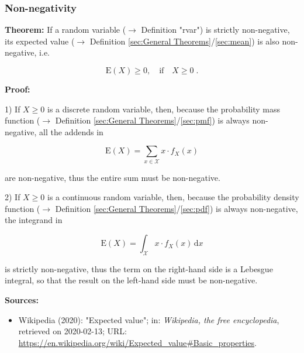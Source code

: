 \documentclass[a4paper,12pt]{book}
\begin{document}
\subsubsection[\textbf{Non-negativity}]{Non-negativity} \label{sec:mean-nonneg}

\vspace{1em}
\textbf{Theorem:} If a random variable ($\rightarrow$ Definition "rvar") is strictly non-negative, its expected value ($\rightarrow$ Definition \ref{sec:General Theorems}/\ref{sec:mean}) is also non-negative, i.e.

\begin{equation} \label{eq:mean-nonneg-mean-nonneg}
\mathrm{E}(X) \geq 0, \quad \text{if} \quad X \geq 0 \; .
\end{equation}


\vspace{1em}
\textbf{Proof:}

1) If $X \geq 0$ is a discrete random variable, then, because the probability mass function ($\rightarrow$ Definition \ref{sec:General Theorems}/\ref{sec:pmf}) is always non-negative, all the addends in

\begin{equation} \label{eq:mean-nonneg-mean-disc}
\mathrm{E}(X) = \sum_{x \in \mathcal{X}} x \cdot f_X(x)
\end{equation}

are non-negative, thus the entire sum must be non-negative.

\vspace{1em}
2) If $X \geq 0$ is a continuous random variable, then, because the probability density function ($\rightarrow$ Definition \ref{sec:General Theorems}/\ref{sec:pdf}) is always non-negative, the integrand in

\begin{equation} \label{eq:mean-nonneg-mean-cont}
\mathrm{E}(X) = \int_{\mathcal{X}} x \cdot f_X(x) \, \mathrm{d}x
\end{equation}

is strictly non-negative, thus the term on the right-hand side is a Lebesgue integral, so that the result on the left-hand side must be non-negative.

\vspace{1em}
\textbf{Sources:}
\begin{itemize}
\item Wikipedia (2020): "Expected value"; in: \textit{Wikipedia, the free encyclopedia}, retrieved on 2020-02-13; URL: \url{https://en.wikipedia.org/wiki/Expected_value#Basic_properties}.
\end{itemize}
\end{document}
